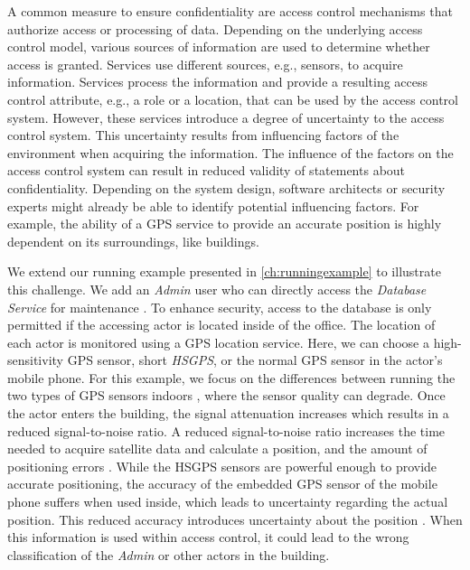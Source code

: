 A common measure to ensure confidentiality are access control mechanisms that authorize access or processing of data. 
Depending on the underlying access control model, various sources of information are used to determine whether access is granted. 
Services use different sources, e.g., sensors, to acquire information. 
Services process the information and provide a resulting access control attribute, e.g., a role or a location, that can be used by the access control system. 
However, these services introduce a degree of uncertainty to the access control system. 
This uncertainty results from influencing factors of the environment when acquiring the information. 
The influence of the factors on the access control system can result in reduced validity of statements about confidentiality. 
Depending on the system design, software architects or security experts might already be able to identify potential influencing factors. 
For example, the ability of a GPS service to provide an accurate position is highly dependent on its surroundings, like buildings. 

We extend our running example presented in \autoref{ch:runningexample} to illustrate this challenge.
We add an \emph{Admin} user who can directly access the \emph{Database Service} for maintenance \cite{walter_context-based_2023}.
To enhance security, access to the database is only permitted if the accessing actor is located inside of the office. 
The location of each actor is monitored using a GPS location service.
Here, we can choose a high-sensitivity GPS sensor, short \emph{HSGPS}, or the normal GPS sensor in the actor's mobile phone.
For this example, we focus on the differences between running the two types of GPS sensors indoors \cite{kjaergaard_indoor_2010}, where the sensor quality can degrade.
Once the actor enters the building, the signal attenuation increases which results in a reduced signal-to-noise ratio.
A reduced signal-to-noise ratio increases the time needed to acquire satellite data and calculate a position, and the amount of positioning errors \cite{kjaergaard_indoor_2010}. 
While the HSGPS sensors are powerful enough to provide accurate positioning, the accuracy of the embedded GPS sensor of the mobile phone suffers when used inside, which leads to uncertainty regarding the actual position. 
This reduced accuracy introduces uncertainty about the position \cite{camara_software_2020}. 
When this information is used within access control, it could lead to the wrong classification of the \emph{Admin} or other actors in the building.

